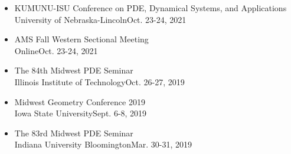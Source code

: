 \documentclass[12pt]{article}
\newenvironment{innerlist}[1][\enskip\textbullet]%
        {\begin{itemize}[#1,leftmargin=*,parsep=0pt,itemsep=0pt,topsep=0pt,partopsep=0pt]}
        {\end{itemize}}
\begin{document}
\begin{innerlist}
\item KUMUNU-ISU Conference on PDE, Dynamical Systems, and Applications\\ University of Nebraska-Lincoln\hfill Oct. 23-24, 2021

\item AMS Fall Western Sectional Meeting\\ Online\hfill Oct. 23-24, 2021


\item The 84th Midwest PDE Seminar\\ Illinois Institute of Technology\hfill Oct. 26-27, 2019

\item Midwest Geometry Conference 2019\\ Iowa State University\hfill Sept. 6-8, 2019

\item The 83rd Midwest PDE Seminar\\ Indiana University Bloomington\hfill Mar. 30-31, 2019






\end{innerlist}
\end{document}
